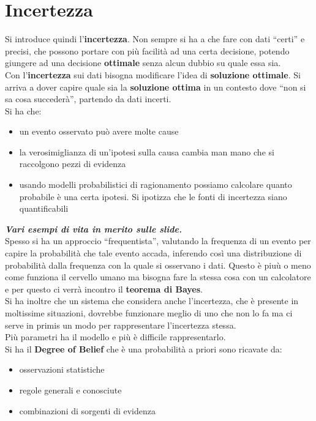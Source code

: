 \message{ !name(modprob.tex)}\documentclass[a4paper,12pt, oneside]{book}
\begin{document}
\section{Incertezza}
Si introduce quindi l'\textbf{incertezza}. Non sempre si ha a che fare con dati
``certi'' e precisi, che possono portare con più facilità ad una certa
decisione, potendo giungere ad una decisione \textbf{ottimale} senza alcun
dubbio su quale essa sia.\\
Con l'\textbf{incertezza} sui dati bisogna modificare l'idea di
\textbf{soluzione ottimale}. Si arriva a dover capire quale sia la
\textbf{soluzione ottima} in un contesto dove ``non si sa cosa succederà'',
partendo da dati incerti.\\
Si ha che:
\begin{itemize}
  \item un evento osservato può avere molte cause
  \item la verosimiglianza di un'ipotesi sulla causa cambia man mano che si
  raccolgono pezzi di evidenza
  \item usando modelli probabilistici di ragionamento possiamo calcolare quanto
  probabile è una certa ipotesi. Si ipotizza che le fonti di incertezza siano
  quantificabili
\end{itemize}
\textbf{\textit{Vari esempi di vita in merito sulle slide.}}\\
Spesso si ha un approccio ``frequentista'', valutando la frequenza di un evento
per capire la probabilità che tale evento accada, inferendo così una
distribuzione di probabilità dalla frequenza con la quale si osservano i
dati. Questo è piuù o meno come funziona il cervello umano ma bisogna fare la
stessa cosa con un calcolatore e per questo ci verrà incontro il \textbf{teorema
  di Bayes}.\\
Si ha inoltre che un sistema che considera anche l'incertezza, che è presente in
moltissime situazioni, dovrebbe funzionare meglio di uno che non lo fa ma ci
serve in primis un modo per rappresentare l'incertezza stessa. \\
Più parametri ha il modello e più è difficile rappresentarlo.\\
Si ha il \textbf{Degree of Belief} che è una probabilità a priori sono ricavate
da:
\begin{itemize}
  \item osservazioni statistiche
  \item regole generali e conosciute
  \item combinazioni di sorgenti di evidenza
\end{itemize}
\end{document}

